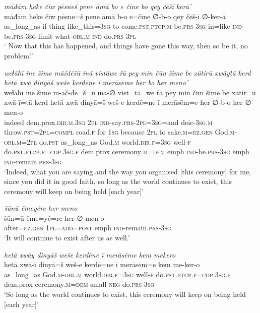 \ea \label{ZP.125}
\textit{māđām heke čīw pēsneš pene āmā bo e čīne bo qey čēšī kerā’} \\ 
\gll māđām heke čīw pēsne=š pene āmā b-o e=čīne ∅-b-o qey čēš-ī ∅-ker-ā \\ 
 as\_long\_as if thing like\_this\textsc{=3sg} to come\textsc{.pst}\textsc{.ptcp}\textsc{.m} be\textsc{.prs}\textsc{-3sg} in=like \textsc{ind-}be\textsc{.prs}\textsc{-3sg} limit what\textsc{-obl}\textsc{.m} \textsc{ind-}do\textsc{.prs}\textsc{-3pl} \\ 
\glt ` Now that this has happened, and things have gone this way, then so be it, no problem!'
\z 
 
\ea \label{ZP.128}
\textit{weɫāhī īne šime māčdēšū īnā vistāwe řā pey min čūn šime be xātirū xwāytā kerd hetā xwā dinyāš weše kerdēne ī merāsēme her bo her meno’} \\ 
\gll weɫāhī īne šime m-āč-dē=š=ū īnā-∅ vist=tā=we řā pey min čūn šime be xātir=ū xwā-ī=tā kerd hetā xwā dinyā=š weš-e kerdē=ne ī merāsēm=e her ∅-b-o her ∅-men-o \\ 
 indeed dem.prox\textsc{.dir}\textsc{.m}\textsc{.3sg} \textsc{2pl} \textsc{ind-}say\textsc{.prs}-\textsc{2pl}\textsc{=3sg}=and deic\textsc{-3sg}\textsc{.m} throw\textsc{.pst}=\textsc{2pl}\textsc{=compl} road\textsc{.f} for \textsc{1sg} because \textsc{2pl} to sake\textsc{.m}\textsc{\textsc{=ez.gen}} God\textsc{.m}\textsc{-obl}\textsc{.m}=\textsc{2pl} do\textsc{.pst} as\_long\_as God\textsc{.m} world\textsc{.dir}\textsc{.f}\textsc{=3sg} well\textsc{-f} do\textsc{.pst}\textsc{.ptcp}\textsc{.f}\textsc{=cop}\textsc{.3sg}\textsc{.f} dem.prox ceremony\textsc{.m}\textsc{=dem} emph \textsc{ind-}be\textsc{.prs}\textsc{-3sg} emph \textsc{ind-}remain\textsc{.prs}\textsc{-3sg} \\ 
\glt `Indeed, what you are saying and the way you organised [this ceremony] for me, since you did it in good faith, so long as the world continues to exist, this ceremony will keep on being held [each year]'
\z 
 
\ea \label{ZP.129}
\textit{šūnū ēmeyčre her meno} \\ 
\gll šūn=ū ēme=yč=re her ∅-men-o \\ 
 after\textsc{\textsc{=ez.gen}} \textsc{1pl}\textsc{=add}\textsc{=\textsc{post}} emph \textsc{ind-}remain\textsc{.prs}\textsc{-3sg} \\ 
\glt `It will continue to exist after us as well.'
\z 
 
\ea \label{ZP.130}
\textit{hetā xwāy dinyāš weše kerdēne ī merāsēme kem mekero} \\ 
\gll hetā xwā-ī dinyā=š weš-e kerdē=ne ī merāsēm=e kem me-ker-o \\ 
 as\_long\_as God\textsc{.m}\textsc{-obl}\textsc{.m} world\textsc{.dir}\textsc{.f}\textsc{=3sg} well\textsc{-f} do\textsc{.pst}\textsc{.ptcp}\textsc{.f}\textsc{=cop}\textsc{.3sg}\textsc{.f} dem.prox ceremony\textsc{.m}\textsc{=dem} small \textsc{neg-}do\textsc{.prs}\textsc{-3sg} \\ 
\glt `So long as the world continues to exist, this ceremony will keep on being held [each year]'
\z 
 
